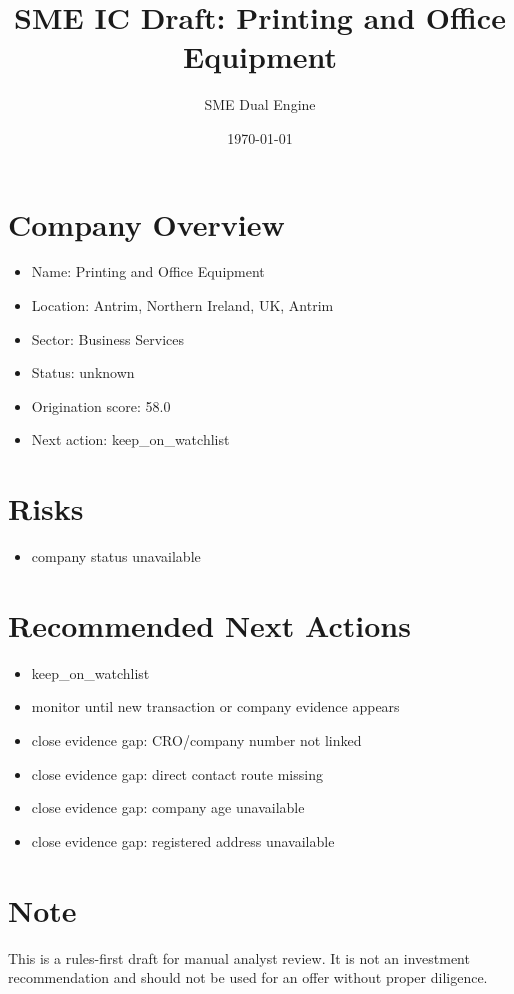 \documentclass[11pt,a4paper]{article}
\title{SME IC Draft: Printing and Office Equipment}
\author{SME Dual Engine}
\date{\today}
\begin{document}
\maketitle
\section*{Company Overview}
\begin{itemize}[leftmargin=1.4em]
\item Name: Printing and Office Equipment
\item Location: Antrim, Northern Ireland, UK, Antrim
\item Sector: Business Services
\item Status: unknown
\item Origination score: 58.0
\item Next action: keep\_on\_watchlist
\end{itemize}
\section*{Risks}
\begin{itemize}[leftmargin=1.4em]
\item company status unavailable
\end{itemize}
\section*{Recommended Next Actions}
\begin{itemize}[leftmargin=1.4em]
\item keep\_on\_watchlist
\item monitor until new transaction or company evidence appears
\item close evidence gap: CRO/company number not linked
\item close evidence gap: direct contact route missing
\item close evidence gap: company age unavailable
\item close evidence gap: registered address unavailable
\end{itemize}
\section*{Note}
This is a rules-first draft for manual analyst review. It is not an investment
recommendation and should not be used for an offer without proper diligence.
\end{document}
